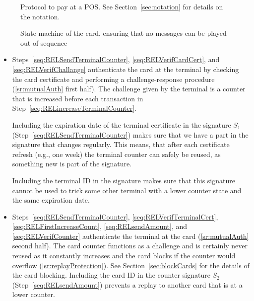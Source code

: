 \documentclass{article}
\begin{document}
\begin{figure}
    \centering
    
    \vspace*{-12pt}
    \caption{Protocol to pay at a POS.
    See Section~\ref{sec:notation} for details on the notation.
    }
    \label{fig:ReloadProtocol}
\end{figure}

\begin{figure}
    \centering
    
    \caption{State machine of the card, ensuring that no messages can be played out of sequence}
    \label{fig:stateMachine}
\end{figure}


\begin{itemize}
    \item Steps~\ref{seq:RELSendTerminalCounter}, \ref{seq:RELVerifCardCert}, and \ref{seq:RELVerifChallange} authenticate the card at the terminal by checking the card certificate and performing a challenge-response procedure (\ref{sr:mutualAuth} first half).
    The challenge given by the terminal is a counter that is increased before each transaction in Step~\ref{seq:RELincreaseTerminalCounter}.
    
    Including the expiration date of the terminal certificate in the signature $S_1$ (Step~\ref{seq:RELSendTerminalCounter}) makes sure that we have a part in the signature that changes regularly.
    This means, that after each certificate refresh (e.g., one week) the terminal counter can safely be reused, as something new is part of the signature.
    
    Including the terminal ID in the signature makes sure that this signature cannot be used to trick some other terminal with a lower counter state and the same expiration date.
    
    \item Steps~\ref{seq:RELSendTerminalCounter}, \ref{seq:RELVerifTerminalCert}, \ref{seq:RELFirstIncreaseCount}, \ref{seq:RELsendAmount}, and \ref{seq:RELVerifCounter} authenticate the terminal at the card (\ref{sr:mutualAuth} second half).
    The card counter functions as a challenge and is certainly never reused as it constantly increases and the card blocks if the counter would overflow (\ref{sr:replayProtection}).
    See Section~\ref{sec:blockCards} for the details of the card blocking.
    Including the card ID in the counter signature $S_2$ (Step~\ref{seq:RELsendAmount}) prevents a replay to another card that is at a lower counter.


\end{itemize}
\end{document}
